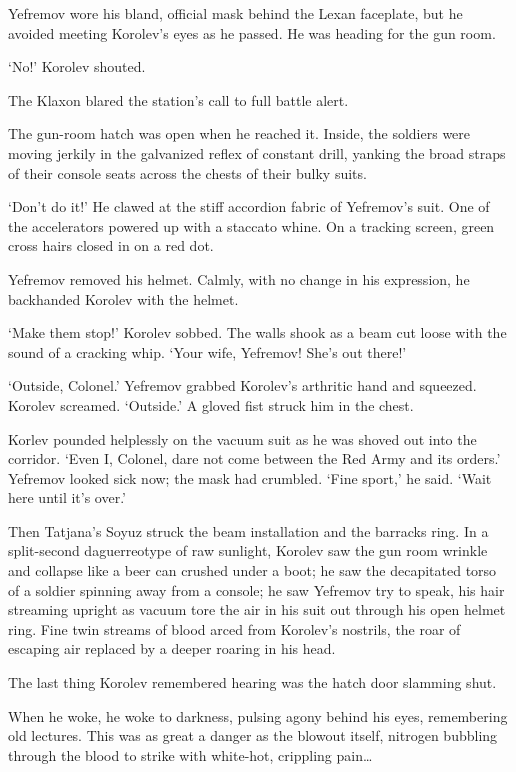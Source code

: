Yefremov wore his bland, official mask behind the Lexan faceplate, but he avoided meeting Korolev's eyes as he passed. He was heading for the gun room.

`No!' Korolev shouted.

The Klaxon blared the station's call to full battle alert.

The gun-room hatch was open when he reached it. Inside, the soldiers were moving jerkily in the galvanized reflex of constant drill, yanking the broad straps of their console seats across the chests of their bulky suits.

`Don't do it!' He clawed at the stiff accordion fabric of Yefremov's suit. One of the accelerators powered up with a staccato whine. On a tracking screen, green cross hairs closed in on a red dot.

Yefremov removed his helmet. Calmly, with no change in his expression, he backhanded Korolev with the helmet.

`Make them stop!' Korolev sobbed. The walls shook as a beam cut loose with the sound of a cracking whip. `Your wife, Yefremov! She's out there!'

`Outside, Colonel.' Yefremov grabbed Korolev's arthritic hand and squeezed. Korolev screamed. `Outside.' A gloved fist struck him in the chest.

Korlev pounded helplessly on the vacuum suit as he was shoved out into the corridor. `Even I, Colonel, dare not come between the Red Army and its orders.' Yefremov looked sick now; the mask had crumbled. `Fine sport,' he said. `Wait here until it's over.'

Then Tatjana's Soyuz struck the beam installation and the barracks ring. In a split-second daguerreotype of raw sunlight, Korolev saw the gun room wrinkle and collapse like a beer can crushed under a boot; he saw the decapitated torso of a soldier spinning away from a console; he saw Yefremov try to speak, his hair streaming upright as vacuum tore the air in his suit out through his open helmet ring. Fine twin streams of blood arced from Korolev's nostrils, the roar of escaping air replaced by a deeper roaring in his head.

The last thing Korolev remembered hearing was the hatch door slamming shut.

When he woke, he woke to darkness, pulsing agony behind his eyes, remembering old lectures. This was as great a danger as the blowout itself, nitrogen bubbling through the blood to strike with white-hot, crippling pain\ldots

